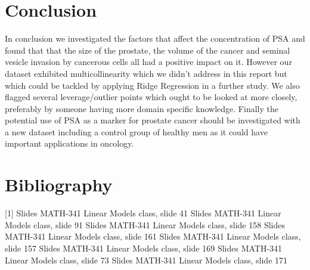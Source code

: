 \documentclass[10pt]{article}
\begin{document}
\section{Conclusion}

\quad In conclusion we investigated the factors that affect the concentration of PSA and found that that the size of the prostate, the volume of the cancer and seminal vesicle invasion by cancerous cells all had a positive impact on it. However our dataset exhibited multicollinearity which we didn't address in this report but which could be tackled by applying Ridge Regression in a further study. We also flagged several leverage/outlier points which ought to be looked at more closely, preferably by someone having more domain specific knowledge. Finally the potential use of PSA as a marker for prostate cancer should be investigated with a new dataset including a control group of healthy men as it could have important applications in oncology.

\newpage

\section{Bibliography}

[1] Slides MATH-341 Linear Models class, slide 41 \newline
[2] Slides MATH-341 Linear Models class, slide 91 \newline
[3] Slides MATH-341 Linear Models class, slide 158 \newline
[4] Slides MATH-341 Linear Models class, slide 161 \newline
[5] Slides MATH-341 Linear Models class, slide 157 \newline
[6] Slides MATH-341 Linear Models class, slide 169 \newline
[7] Slides MATH-341 Linear Models class, slide 73 \newline
[8] Slides MATH-341 Linear Models class, slide 171 \newline
\end{document}
